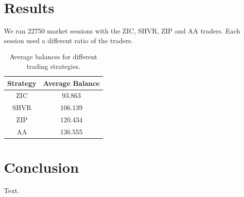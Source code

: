 \documentclass[preprint]{acm_proc_article-sp} %
\begin{document}
\section{Results} \label{sec:results}

We ran 22750 market sessions with the ZIC, SHVR, ZIP and AA traders.
Each session used a different ratio of the traders.

\begin{table}[h]
  \centering
  \label{tbl:results}
  \begin{tabular}{ | c | c | }
    \hline
    Strategy & Average Balance \\
    \hline
    ZIC & 93.863 \\
    \hline
    SHVR & 106.139 \\
    \hline
    ZIP & 120.434 \\
    \hline
    AA & 136.555 \\
    \hline
  \end{tabular}
  \caption{Average balances for different trading strategies.}
\end{table}


\section{Conclusion} \label{sec:conclusion}
Text.\\




\end{document}
